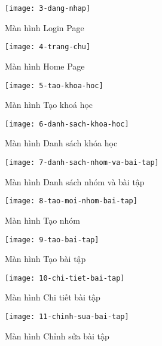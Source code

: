 \documentclass[../Thesis.tex]{subfiles}
\begin{document}
    \begin{figure}[ht!]
        \centering\texttt{[image: 3-dang-nhap]}
        \caption{Màn hình Login Page}
        \label{fig:dang-nhap}
    \end{figure}

    \begin{figure}[ht!]
        \centering\texttt{[image: 4-trang-chu]}
        \caption{Màn hình Home Page}
        \label{fig:trang-chu}
    \end{figure}

    \begin{figure}[ht!]
        \centering\texttt{[image: 5-tao-khoa-hoc]}
        \caption{Màn hình Tạo khoá học}
        \label{fig:tao-khoa-hoc}
    \end{figure}
    \begin{figure}[ht!]
        \centering\texttt{[image: 6-danh-sach-khoa-hoc]}
        \caption{Màn hình Danh sách khóa học}
        \label{fig:danh-sach-khoa-hoc}
    \end{figure}
    
    \begin{figure}[ht!]
        \centering\texttt{[image: 7-danh-sach-nhom-va-bai-tap]}
        \caption{Màn hình Danh sách nhóm và bài tập}
        \label{fig:danh-sach-group-va-bai-tap}
    \end{figure}


    \begin{figure}[ht!]
        \centering\texttt{[image: 8-tao-moi-nhom-bai-tap]}
        \caption{Màn hình Tạo nhóm}
        \label{fig:tao-moi-nhom-bai-tap}
    \end{figure}

    \begin{figure}[ht!]
        \centering\texttt{[image: 9-tao-bai-tap]}
        \caption{Màn hình Tạo bài tập}
        \label{fig:tao-moi-bai-tap}
    \end{figure}

    \begin{figure}[ht!]
        \centering\texttt{[image: 10-chi-tiet-bai-tap]}
        \caption{Màn hình Chi tiết bài tập}
        \label{fig:chi-tiet-bai-tap}
    \end{figure}

    \begin{figure}[ht!]
        \centering\texttt{[image: 11-chinh-sua-bai-tap]}
        \caption{Màn hình Chỉnh sửa bài tập}
        \label{fig:chinh-sua-bai-tap}
    \end{figure}
\end{document}
